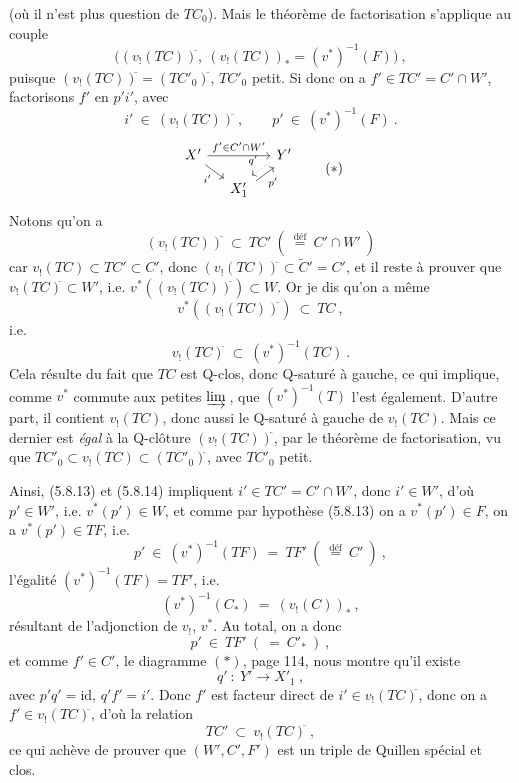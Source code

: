 \documentclass[11pt]{article}
\newcommand{\printedpage}[1]{\marginpar{\footnotesize p.~#1}}
\newcommand{\msp}[1]{\marginpar{\footnotesize [#1]}}
\newcommand{\defeq}{\overset{\text{déf}}{=}}
\newcommand{\cl}{^{\tilde{}}}%
\begin{document}
(où il n'est plus question de $TC_0$). Mais le théorème de factorisation s'applique au couple
\[
\Big( (v_!(TC))\cl,\ (v_!(TC))_* = (v^*)^{-1}(F) \Big)\ ,
\]
puisque $(v_!(TC))\cl = (TC'_0)\cl$, $TC'_0$ petit. Si donc on a $f' \in TC' = C' \cap W'$, factorisons $f'$ en $p'i'$, avec
\[
i' \ \in \ (v_!(TC))\cl\ , \qquad p' \ \in \ (v^*)^{-1}(F)\ .
\tag*{(5.8.13)}
\]
\[
\begin{tikzcd}[column sep=small, row sep=small]
X' \arrow[rr, "f' \in C' \cap W'"] \arrow[dr, "i'"'] & & Y' \arrow[dl, dotted, shift right, "q'"'] \\
& X'_1 \arrow[ur, shift right, "p'"'] &
\end{tikzcd}
\tag*{$(*)$}
\]
Notons qu'on a
\msp{page 95}
\[
(v_!(TC))\cl \ \subset \ TC' \ (\ \defeq \ C' \cap W'\ )
\tag*{(5.8.14)}
\]
car $v_!(TC) \subset TC' \subset C'$, donc $(v_!(TC))\cl \subset \tilde{C}' = C'$, et il reste à prouver que $v_!(TC)\cl \subset W'$, i.e. $v^*((v_!(TC))\cl) \subset W$. Or je dis qu'on a même
\[
v^*((v_!(TC))\cl) \ \subset \ TC\ ,
\]
i.e.
\[
v_!(TC)\cl \ \subset \ (v^*)^{-1}(TC)\ .
\tag*{(5.8.15)}
\]
Cela résulte du fait que $TC$ est Q-clos, donc Q-saturé à gauche, ce qui implique, comme $v^*$ commute aux petites $\varinjlim$\,, que $(v^*)^{-1}(T)$ l'est également. D'autre part, il contient $v_!(TC)$, donc aussi le Q-saturé à gauche de $v_!(TC)$. Mais ce dernier est \textit{égal} à la Q-clôture $(v_!(TC))\cl$, par le théorème de factorisation, vu que $TC'_0 \subset v_!(TC) \subset (TC'_0)\cl$, avec $TC'_0$ petit. %

Ainsi, (5.8.13) et (5.8.14) impliquent $i' \in TC' = C' \cap W'$, donc $i' \in W'$, d'où $p' \in W'$, i.e. $v^*(p') \in W$, et comme par hypothèse
\printedpage{48}
\msp{page 96}
(5.8.13) on a $v^*(p') \in F$, on a $v^*(p') \in TF$, i.e.
\[
p' \ \in \ (v^*)^{-1}(TF) \ = \ TF' \ (\ \defeq \ C'\ )\ , %
\]
l'égalité $(v^*)^{-1}(TF) = TF'$, i.e.
\[
(v^*)^{-1}(C_*) \ = \ (v_!(C))_*\ ,
\]
résultant de l'adjonction de $v_!$, $v^*$. Au total, on a donc
\[
p' \ \in \ TF' \ (\ = \ C'_*\ )\ ,
\tag*{(5.8.16)}
\]
et comme $f' \in C'$, le diagramme $(*)$, page 114, nous montre qu'il existe
\[
q' \ : \ Y' \longrightarrow X'_1\ ,
\]
avec $p'q' = \mathrm{id}$, $q'f' = i'$. Donc $f'$ est facteur direct de $i' \in v_!(TC)\cl$, donc on a $f' \in v_!(TC)\cl$, d'où la relation
\[
TC' \ \subset \ v_!(TC)\cl\ ,
\]
ce qui achève de prouver que $(W', C', F')$ est un triple de Quillen spécial et clos.
\end{document}
